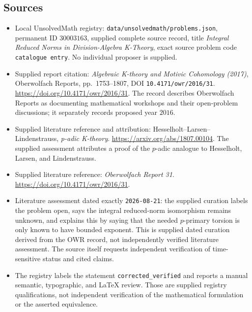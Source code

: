 \documentclass[11pt]{article}
\begin{document}
\subsection{Sources}
\begin{itemize}
\item Local UnsolvedMath registry: \texttt{data/unsolvedmath/problems.json}, permanent ID \(30003163\), supplied complete source record, title \emph{Integral Reduced Norms in Division-Algebra K-Theory}, exact source problem code \texttt{catalogue entry}. No individual proposer is supplied.
\item Supplied report citation: \emph{Algebraic K-theory and Motivic Cohomology (2017)}, Oberwolfach Reports, pp.~1753--1807, DOI \texttt{10.4171/owr/2016/31}. \url{https://doi.org/10.4171/owr/2016/31}. The record describes Oberwolfach Reports as documenting mathematical workshops and their open-problem discussions; it separately records proposed year \(2016\).
\item Supplied literature reference and attribution: Hesselholt--Larsen--Lindenstrauss, \emph{p-adic K-theory}. \url{https://arxiv.org/abs/1807.00104}. The supplied assessment attributes a proof of the \(p\)-adic analogue to Hesselholt, Larsen, and Lindenstrauss.
\item Supplied literature reference: \emph{Oberwolfach Report 31}. \url{https://doi.org/10.4171/owr/2016/31}.
\item Literature assessment dated exactly \texttt{2026-08-21}: the supplied curation labels the problem open, says the integral reduced-norm isomorphism remains unknown, and explains this by saying that the needed \(p\)-primary torsion is only known to have bounded exponent. This is supplied dated curation derived from the OWR record, not independently verified literature assessment. The source itself requests independent verification of time-sensitive status and cited claims.
\item The registry labels the statement \texttt{corrected\_verified} and reports a manual semantic, typographic, and LaTeX review. Those are supplied registry qualifications, not independent verification of the mathematical formulation or the asserted equivalence.
\end{itemize}
\end{document}
